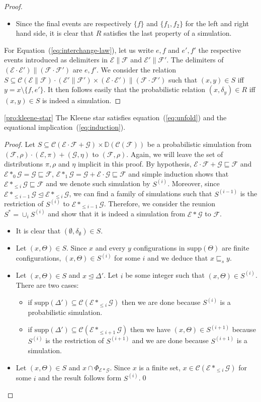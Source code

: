 \documentclass{llncs}
\newcommand{\C}{\mathcal{C}}
\newcommand{\D}{\mathbb{D}}
\newcommand{\EE}{\mathcal{E}}
\newcommand{\FF}{\mathcal{F}}
\newcommand{\G}{\mathcal{G}}
\newcommand{\refby}{\sqsubseteq}
\newcommand{\prefix}{\trianglelefteq}
\newcommand{\<}{\langle}
\renewcommand{\>}{\rangle}
\newcommand{\supp}{\mathrm{supp}}
\newcommand{\exit}{\Phi}
\begin{document}
\begin{proof}
\begin{itemize}
\begin{itemize}
\end{itemize}
\item Since the final events are respectively $\{f\}$ and $\{f_1,f_2\}$ for the left and right hand side, it is clear that $R$ satisfies the last property of a simulation.
\end{itemize}
For Equation~(\ref{eq:interchange-law}), let us write $e,f$ and $e',f'$ the respective events introduced as delimiters in $\EE\|\FF$ and $\EE'\|\FF'$. The delimiters of $(\EE\cdot\EE')\|(\FF\cdot\FF')$ are $e,f'$. We consider the relation $S\subseteq \C(\EE\|\FF)\cdot(\EE'\|\FF')\times (\EE\cdot\EE')\|(\FF\cdot\FF')$ such that $(x,y)\in S$ iff $y = x\setminus\{f,e'\}$. It then follows easily that the probabilistic relation $(x,\delta_y)\in R$ iff $(x,y)\in S$ is indeed a simulation.
\end{proof}

\begin{repproposition}{\ref{pro:kleene-star}}
The Kleene star satisfies equation~(\ref{eq:unfold}) and the equational  implication~(\ref{eq:induction}).
\end{repproposition}
\begin{proof}
Let $S\subseteq\C(\EE\cdot\FF + \G)\times\D(\C(\FF))$ be a probabilistic simulation from $(\FF,\rho)\cdot(\EE,\pi) + (\G,\eta)$ to $(\FF,\rho)$. Again, we will leave the set of distributions $\pi,\rho$ and $\eta$ implicit in this proof. By hypothesis, $\EE\cdot\FF + \G\refby \FF$ and $\EE*_0\G = \G\refby\FF$,  $\EE*_1\G = \G + \EE\cdot\G\refby\FF$ and simple induction shows that $\EE*_{\le i}\G\refby\FF$ and we denote such simulation by $S^{(i)}$. Moreover, since $\EE*_{\le i-1}\G\prefix\EE*_{\le i}\G$, we can find a family of simulations such that $S^{(i-1)}$ is the restriction of $S^{(i)}$ to $\EE*_{\le i-1}\G$. Therefore, we consider the reunion $S^* = \cup_i S^{(i)}$ and show that it is indeed a simulation from $\EE*\G$ to $\FF$.
\begin{itemize}
\item It is clear that $(\emptyset,\delta_\emptyset)\in S$.
\item Let $(x,\Theta)\in S$. Since $x$ and every $y$ configurations in $\supp(\Theta)$ are finite configurations, $(x,\Theta)\in S^{(i)}$ for some $i$ and we deduce that $x\refby_s y$.
\item Let $(x,\Theta)\in S$ and $x\prefix\Delta'$. Let $i$ be some integer such that $(x,\Theta)\in S^{(i)}$. There are two cases:
\begin{itemize}
\item if $\supp(\Delta')\subseteq \C(\EE*_{\le i} \G)$ then we are done because $S^{(i)}$ is a probabilistic simulation.
\item if $\supp(\Delta')\subseteq \C(\EE*_{\le i+1}\G)$ then we have $(x,\Theta)\in S^{(i+1)}$ because $S^{(i)}$ is the restriction of $S^{(i+1)}$ and we are done because $S^{(i+1)}$ is a simulation. 
\end{itemize}
\item Let $(x,\Theta)\in S$ and $x\cap\exit_{\EE*\G}$. Since $x$ is a finite set, $x\in \C(\EE*_{\le i}\G)$ for some $i$ and the result follows form $S^{(i)}$.\qed
\end{itemize}
\end{proof}
\clearpage{}
\end{document}
